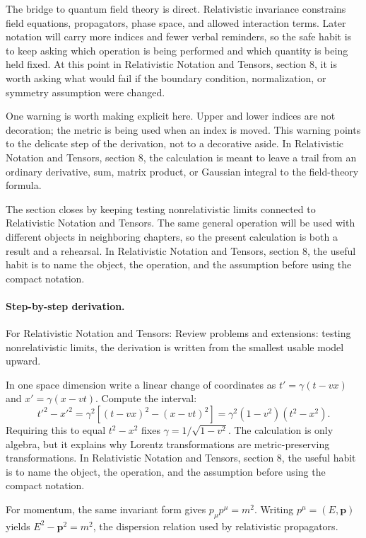 The bridge to quantum field theory is direct.  Relativistic invariance constrains field equations, propagators, phase space, and allowed interaction terms.  Later notation will carry more indices and fewer verbal reminders, so the safe habit is to keep asking which operation is being performed and which quantity is being held fixed.  At this point in Relativistic Notation and Tensors, section 8, it is worth asking what would fail if the boundary condition, normalization, or symmetry assumption were changed.

One warning is worth making explicit here.  Upper and lower indices are not decoration; the metric is being used when an index is moved.  This warning points to the delicate step of the derivation, not to a decorative aside.  In Relativistic Notation and Tensors, section 8, the calculation is meant to leave a trail from an ordinary derivative, sum, matrix product, or Gaussian integral to the field-theory formula.

The section closes by keeping testing nonrelativistic limits connected to Relativistic Notation and Tensors.  The same general operation will be used with different objects in neighboring chapters, so the present calculation is both a result and a rehearsal.  In Relativistic Notation and Tensors, section 8, the useful habit is to name the object, the operation, and the assumption before using the compact notation.



\paragraph{Step-by-step derivation.}

For Relativistic Notation and Tensors: Review problems and extensions: testing nonrelativistic limits, the derivation is written from the smallest usable model upward.

In one space dimension write a linear change of coordinates as \(t'=\gamma(t-vx)\) and \(x'=\gamma(x-vt)\).  Compute the interval:
\[
  t'^2-x'^2
  =
  \gamma^2[(t-vx)^2-(x-vt)^2]
  =
  \gamma^2(1-v^2)(t^2-x^2).
\]
Requiring this to equal \(t^2-x^2\) fixes \(\gamma=1/\sqrt{1-v^2}\).  The calculation is only algebra, but it explains why Lorentz transformations are metric-preserving transformations.  In Relativistic Notation and Tensors, section 8, the useful habit is to name the object, the operation, and the assumption before using the compact notation.

For momentum, the same invariant form gives \(p_\mu p^\mu=m^2\).  Writing \(p^\mu=(E,\bm p)\) yields \(E^2-\bm p^2=m^2\), the dispersion relation used by relativistic propagators.

